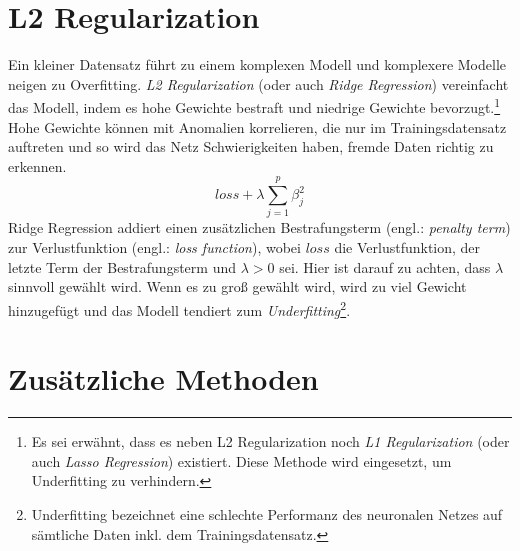 \section{L2 Regularization}

Ein kleiner Datensatz führt zu einem komplexen Modell und komplexere Modelle neigen zu Overfitting. \textit{L2 Regularization} (oder auch \textit{Ridge Regression}) vereinfacht das Modell, indem es hohe Gewichte bestraft und niedrige Gewichte bevorzugt.\footnote{Es sei erwähnt, dass es neben L2 Regularization noch \textit{L1 Regularization} (oder auch \textit{Lasso Regression}) existiert. Diese Methode wird eingesetzt, um Underfitting zu verhindern.} Hohe Gewichte können mit Anomalien korrelieren, die nur im Trainingsdatensatz auftreten und so wird das Netz Schwierigkeiten haben, fremde Daten richtig zu erkennen. 
\begin{equation}\label{equation:l2}
	loss + \lambda\sum_{j=1}^p\beta_j^2
\end{equation}
Ridge Regression addiert einen zusätzlichen Bestrafungsterm (engl.: \textit{penalty term}) zur Verlustfunktion (engl.: \textit{loss function}), wobei $loss$ die Verlustfunktion, der letzte Term der Bestrafungsterm und $\lambda > 0$ sei. Hier ist darauf zu achten, dass $\lambda$ sinnvoll gewählt wird. Wenn es zu groß gewählt wird, wird zu viel Gewicht hinzugefügt und das Modell tendiert zum \textit{Underfitting}\footnote{Underfitting bezeichnet eine schlechte Performanz des neuronalen Netzes auf sämtliche Daten inkl. dem Trainingsdatensatz.}.\cite{ref:regulization:nagpal}\cite{ref:regulization:gupta}

\section{Zusätzliche Methoden}

